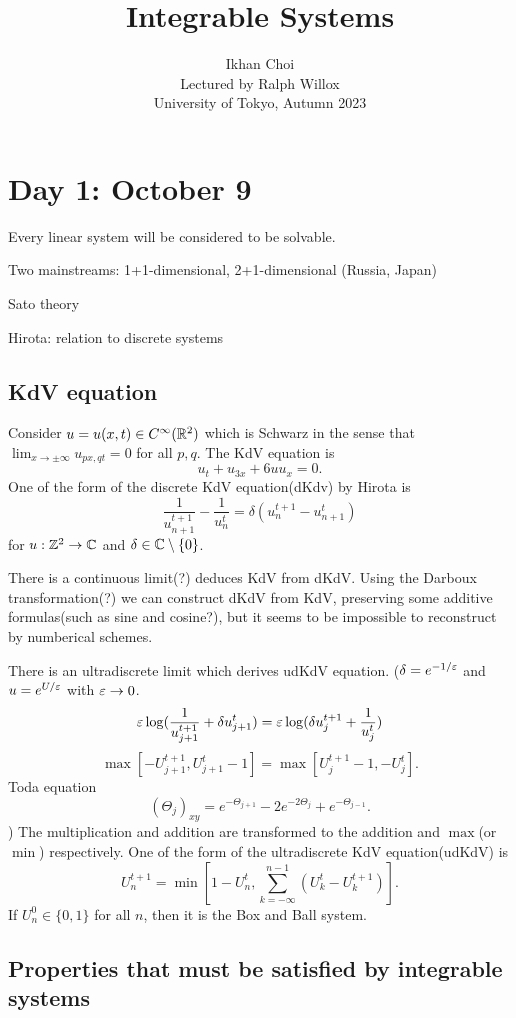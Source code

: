 \documentclass{../../../small}
\begin{document}
\title{Integrable Systems}
\author{Ikhan Choi\\Lectured by Ralph Willox\\University of Tokyo, Autumn 2023}
\maketitle
\tableofcontents

\newpage
\section{Day 1: October 9}

Every linear system will be considered to be solvable.

Two mainstreams: 1+1-dimensional, 2+1-dimensional (Russia, Japan)

Sato theory

Hirota: relation to discrete systems

\subsection*{KdV equation}
Consider $u=u(x,t)\in C^\infty(\mathbb{R}^2)$ which is Schwarz in the sense that $\lim_{x\to\pm\infty}u_{px,qt}=0$ for all $p,q$.
The KdV equation is
\[u_t+u_{3x}+6uu_x=0.\]
One of the form of the discrete KdV equation(dKdv) by Hirota is
\[\frac1{u_{n+1}^{t+1}}-\frac1{u_n^t}=\delta(u_n^{t+1}-u_{n+1}^t)\]
for $u:\mathbb{Z}^2\to\mathbb{C}$ and $\delta\in\mathbb{C}\setminus\{0\}$.

There is a continuous limit(?) deduces KdV from dKdV.
Using the Darboux transformation(?) we can construct dKdV from KdV, preserving some additive formulas(such as sine and cosine?), but it seems to be impossible to reconstruct by numberical schemes.

There is an ultradiscrete limit which derives udKdV equation.
($\delta=e^{-1/\varepsilon}$ and $u=e^{U/\varepsilon}$ with $\varepsilon\to0$.
\[\varepsilon\log(\frac1{u_{j+1}^{t+1}}+\delta u_{j+1}^t)=\varepsilon\log(\delta u_j^{t+1}+\frac1{u_j^t})\]
\[\max[-U_{j+1}^{t+1},U_{j+1}^t-1]=\max[U_j^{t+1}-1,-U_j^t].\]
Toda equation
\[(\Theta_j)_{xy}=e^{-\Theta_{j+1}}-2e^{-2\Theta_j}+e^{-\Theta_{j-1}}.\]
)
The multiplication and addition are transformed to the addition and $\max$(or $\min$) respectively.
One of the form of the ultradiscrete KdV equation(udKdV) is
\[U_n^{t+1}=\min\left[1-U_n^t,\sum_{k=-\infty}^{n-1}(U_k^t-U_k^{t+1})\right].\]
If $U_n^0\in\{0,1\}$ for all $n$, then it is the Box and Ball system.

\subsection*{Properties that must be satisfied by integrable systems}
\end{document}
